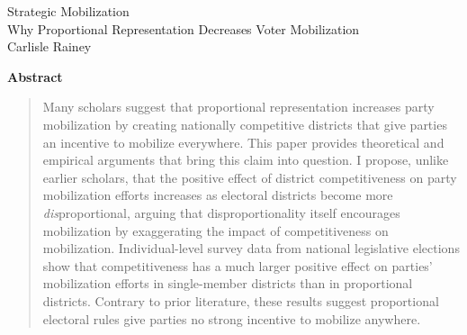 \documentclass[12pt]{article}
\begin{document}
\begin{center}
{\LARGE Strategic Mobilization}\\\vspace{2mm}
{\large Why Proportional Representation Decreases Voter Mobilization}\\
\vspace{3mm}
Carlisle Rainey\\\singlespace
\end{center}


{\centerline{\textbf{Abstract}}}
\begin{quote}\noindent Many scholars suggest that proportional representation increases party mobilization by creating nationally competitive districts that give parties an incentive to mobilize everywhere. This paper provides theoretical and empirical arguments that bring this claim into question. I propose, unlike earlier scholars, that the positive effect of district competitiveness on party mobilization efforts increases as electoral districts become more \textit{dis}proportional, arguing that disproportionality itself encourages mobilization by exaggerating the impact of competitiveness on mobilization. Individual-level survey data from national legislative elections show that competitiveness has a much larger positive effect on parties' mobilization efforts in single-member districts than in proportional districts. Contrary to prior literature, these results suggest proportional electoral rules give parties no strong incentive to mobilize anywhere.\end{quote}
\thispagestyle{empty}


\newpage
\doublespace
\end{document}

